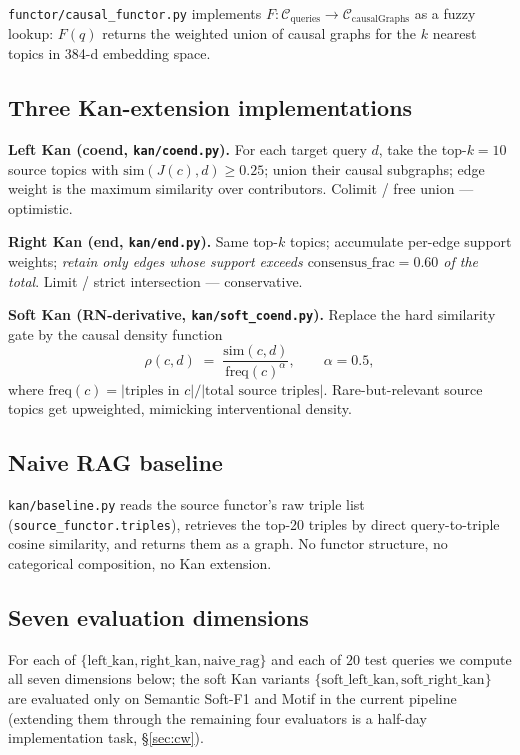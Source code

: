 \documentclass[10pt,letterpaper]{article}
\begin{document}
\texttt{functor/causal\_functor.py} implements $F : \mathcal{C}_{\text{queries}} \to \mathcal{C}_{\text{causalGraphs}}$ as a fuzzy lookup: $F(q)$ returns the weighted union of causal graphs for the $k$ nearest topics in 384-d embedding space.

\subsection{Three Kan-extension implementations}

\textbf{Left Kan (coend, \texttt{kan/coend.py}).} For each target query $d$, take the top-$k{=}10$ source topics with $\mathrm{sim}(J(c), d) \geq 0.25$; union their causal subgraphs; edge weight is the maximum similarity over contributors. Colimit / free union --- optimistic.

\textbf{Right Kan (end, \texttt{kan/end.py}).} Same top-$k$ topics; accumulate per-edge support weights; \emph{retain only edges whose support exceeds $\mathrm{consensus\_frac}{=}0.60$ of the total}. Limit / strict intersection --- conservative.

\textbf{Soft Kan (RN-derivative, \texttt{kan/soft\_coend.py}).} Replace the hard similarity gate by the causal density function
\[
\rho(c, d) \;=\; \frac{\mathrm{sim}(c, d)}{\mathrm{freq}(c)^{\alpha}}, \qquad \alpha = 0.5,
\]
where $\mathrm{freq}(c) = |\text{triples in } c| / |\text{total source triples}|$. Rare-but-relevant source topics get upweighted, mimicking interventional density.

\subsection{Naive RAG baseline}

\texttt{kan/baseline.py} reads the source functor's raw triple list (\texttt{source\_functor.triples}), retrieves the top-20 triples by direct query-to-triple cosine similarity, and returns them as a graph. No functor structure, no categorical composition, no Kan extension.

\subsection{Seven evaluation dimensions}

For each of $\{\text{left\_kan}, \text{right\_kan}, \text{naive\_rag}\}$ and each of $20$ test queries we compute all seven dimensions below; the soft Kan variants $\{\text{soft\_left\_kan}, \text{soft\_right\_kan}\}$ are evaluated only on Semantic Soft-F1 and Motif in the current pipeline (extending them through the remaining four evaluators is a half-day implementation task, \S\ref{sec:cw}).
\end{document}
